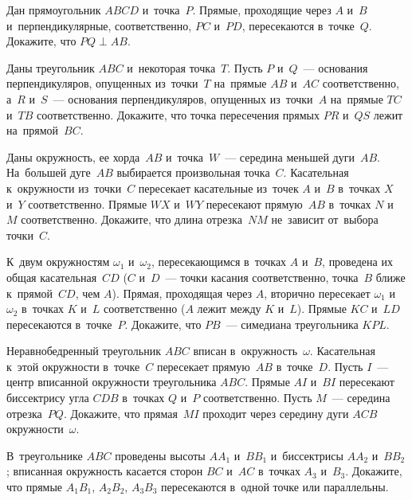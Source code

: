 


\begin{problems}

\item
Дан прямоугольник $ABCD$ и~точка~$P$.
Прямые, проходящие через $A$ и~$B$ и~перпендикулярные, соответственно,
$PC$ и~$PD$, пересекаются в~точке~$Q$.
Докажите, что $PQ \perp AB$.

\item
Даны треугольник $ABC$ и~некоторая точка~$T$.
Пусть $P$ и~$Q$~--- основания перпендикуляров, опущенных из~точки~$T$
на~прямые $AB$ и~$AC$ соответственно, а~$R$ и~$S$~--- основания
перпендикуляров, опущенных из~точки~$A$ на~прямые $TC$ и~$TB$ соответственно.
Докажите, что точка пересечения прямых $PR$ и~$QS$ лежит на~прямой~$BC$.

\item
Даны окружность, ее хорда~$AB$ и~точка~$W$~--- середина меньшей дуги~$AB$.
На~большей дуге~$AB$ выбирается произвольная точка~$C$.
Касательная к~окружности из~точки~$C$ пересекает касательные из~точек $A$ и~$B$
в~точках $X$ и~$Y$ соответственно.
Прямые $WX$ и~$WY$ пересекают прямую~$AB$ в~точках $N$ и~$M$ соответственно.
Докажите, что длина отрезка~$NM$ не~зависит от~выбора точки~$C$.

\item
К~двум окружностям $\omega_{1}$ и~$\omega_{2}$, пересекающимся
в~точках $A$ и~$B$, проведена их общая касательная~$CD$ ($C$ и~$D$~--- точки
касания соответственно, точка~$B$ ближе к~прямой~$CD$, чем $A$).
Прямая, проходящая через $A$, вторично пересекает $\omega_{1}$ и~$\omega_{2}$
в~точках $K$ и~$L$ соответственно ($A$ лежит между $K$ и~$L$).
Прямые $KC$ и~$LD$ пересекаются в~точке~$P$.
Докажите, что $PB$~--- симедиана треугольника $KPL$.

\item
Неравнобедренный треугольник $ABC$ вписан в~окружность~$\omega$.
Касательная к~этой окружности в~точке~$C$ пересекает прямую~$AB$ в~точке~$D$.
Пусть $I$~--- центр вписанной окружности треугольника $ABC$.
Прямые $AI$ и~$BI$ пересекают биссектрису угла $CDB$ в~точках $Q$ и~$P$
соответственно.
Пусть $M$~--- середина отрезка~$PQ$.
Докажите, что прямая~$MI$ проходит через середину дуги $ACB$
окружности~$\omega$.

\item
В~треугольнике $ABC$ проведены высоты $AA_{1}$ и~$BB_{1}$
и~биссектрисы $AA_{2}$ и~$BB_{2}$;
вписанная окружность касается сторон $BC$ и~$AC$ в~точках $A_{3}$ и~$B_{3}$.
Докажите, что прямые $A_{1}B_{1}$, $A_{2}B_{2}$, $A_{3}B_{3}$ пересекаются
в~одной точке или параллельны.

\end{problems}

